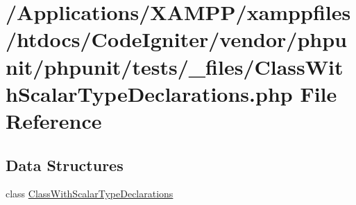 \hypertarget{_class_with_scalar_type_declarations_8php}{}\section{/\+Applications/\+X\+A\+M\+P\+P/xamppfiles/htdocs/\+Code\+Igniter/vendor/phpunit/phpunit/tests/\+\_\+files/\+Class\+With\+Scalar\+Type\+Declarations.php File Reference}
\label{_class_with_scalar_type_declarations_8php}
\subsection*{Data Structures}
\begin{DoxyCompactItemize}
\item 
class \mbox{\hyperlink{class_class_with_scalar_type_declarations}{Class\+With\+Scalar\+Type\+Declarations}}
\end{DoxyCompactItemize}
